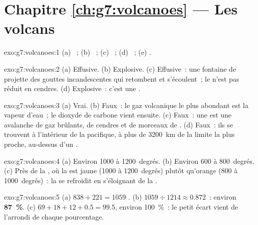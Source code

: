\section*{Chapitre \ref{ch:g7:volcanoes} --- Les volcans}

\begin{solution}{exo:g7:volcanoes:1}
(a) ~; (b) ~; (c) ~; (d) ~; (e) .
\end{solution}

\begin{solution}{exo:g7:volcanoes:2}
(a) Effusive. (b) Explosive. (c) Effusive~: une fontaine de  projette
des gouttes incandescentes qui retombent et s'écoulent~; le  n'est pas
réduit en cendres. (d) Explosive~: c'est une .
\end{solution}

\begin{solution}{exo:g7:volcanoes:3}
(a) Vrai. (b) Faux~: le gaz volcanique le plus abondant est la vapeur
d'eau~; le dioxyde de carbone vient ensuite. (c) Faux~: une  est une avalanche de gaz brûlants, de cendres et de morceaux
de . (d) Faux~: ils se trouvent à l'intérieur de la  pacifique,
à plus de 3200~km de la limite la plus proche, au-dessus d'un .
\end{solution}

\begin{solution}{exo:g7:volcanoes:4}
(a) Environ 1000 à 1200~degrés. (b) Environ 600 à 800~degrés. (c) Près de
la , où la  est jaune (1000 à 1200~degrés) plutôt qu'orange (800
à 1000~degrés)~: la  se refroidit en s'éloignant de la .
\end{solution}

\begin{solution}{exo:g7:volcanoes:5}
(a) $838 + 221 = 1059$ . (b) $1059 \div 1214 \approx 0.872$~:
environ \textbf{87~\%}. (c) $69 + 18 + 12 + 0.5 = 99.5$, environ
100~\%~: le petit écart vient de l'arrondi de chaque pourcentage.
\end{solution}

